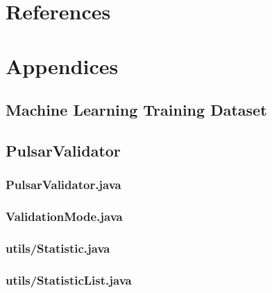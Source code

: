 \documentclass{article}
\begin{document}
\pagebreak
\section{References}
\printbibliography[heading=none]

\pagebreak
\section{Appendices}
\subsection{Machine Learning Training Dataset}


\pagebreak
\subsection{PulsarValidator}
\subsubsection{PulsarValidator.java}


\pagebreak
\subsubsection{ValidationMode.java}


\pagebreak
\subsubsection{utils/Statistic.java}


\pagebreak
\subsubsection{utils/StatisticList.java}

\end{document}
